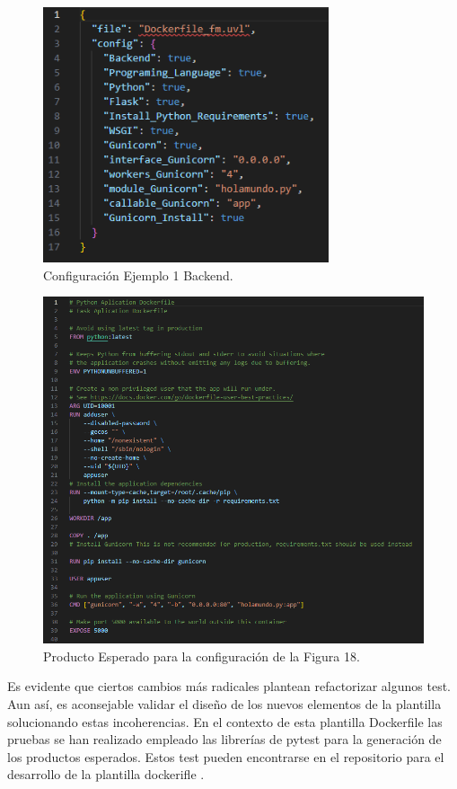 \documentclass[12pt, a4paper, twoside]{article}
\begin{document}
\begin{figure}[h]
	\centering
	  \includegraphics[width=0.75\textwidth]{Dockerfile.configuracion-backend.png}
	\caption{Configuración Ejemplo 1 Backend.}
\end{figure}

\newpage 

\begin{figure}[h]
	\centering
	  \includegraphics[width=1\textwidth]{Dockerfile.backend.producto.png}
	\caption{Producto Esperado para la configuración de la Figura 18.}
\end{figure}

Es evidente que ciertos cambios más radicales plantean refactorizar algunos test. 
Aun así, es aconsejable validar el diseño de los nuevos elementos de la plantilla solucionando estas incoherencias.
En el contexto de esta plantilla Dockerfile las pruebas se han realizado empleado las librerías de pytest \cite{pytest_docs} para la generación de los productos esperados. Estos test pueden encontrarse en el repositorio para el desarrollo de la plantilla dockerifle \cite{Dockerfile_template_dev}.
\end{document}
